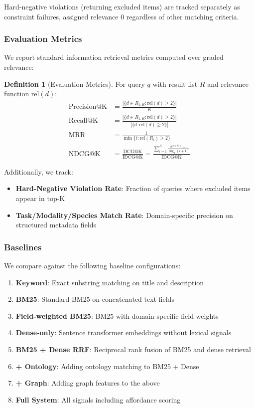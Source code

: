 \documentclass{article}
\theoremstyle{definition}
\newtheorem{definition}{Definition}[section]
\begin{document}
Hard-negative violations (returning excluded items) are tracked separately as constraint failures, assigned relevance 0 regardless of other matching criteria.

\subsubsection{Evaluation Metrics}

We report standard information retrieval metrics computed over graded relevance:

\begin{definition}[Evaluation Metrics]
For query $q$ with result list $R$ and relevance function $\text{rel}(d)$:
\begin{align}
\text{Precision@K} &= \frac{|\{d \in R_{1:K} : \text{rel}(d) \geq 2\}|}{K} \\
\text{Recall@K} &= \frac{|\{d \in R_{1:K} : \text{rel}(d) \geq 2\}|}{|\{d : \text{rel}(d) \geq 2\}|} \\
\text{MRR} &= \frac{1}{\min\{i : \text{rel}(R_i) \geq 2\}} \\
\text{NDCG@K} &= \frac{\text{DCG@K}}{\text{IDCG@K}} = \frac{\sum_{i=1}^{K} \frac{2^{\text{rel}(R_i)} - 1}{\log_2(i+1)}}{\text{IDCG@K}}
\end{align}
\end{definition}

Additionally, we track:
\begin{itemize}
    \item \textbf{Hard-Negative Violation Rate}: Fraction of queries where excluded items appear in top-K
    \item \textbf{Task/Modality/Species Match Rate}: Domain-specific precision on structured metadata fields
\end{itemize}

\subsubsection{Baselines}

We compare against the following baseline configurations:

\begin{enumerate}
    \item \textbf{Keyword}: Exact substring matching on title and description
    \item \textbf{BM25}: Standard BM25 on concatenated text fields
    \item \textbf{Field-weighted BM25}: BM25 with domain-specific field weights
    \item \textbf{Dense-only}: Sentence transformer embeddings without lexical signals
    \item \textbf{BM25 + Dense RRF}: Reciprocal rank fusion of BM25 and dense retrieval
    \item \textbf{+ Ontology}: Adding ontology matching to BM25 + Dense
    \item \textbf{+ Graph}: Adding graph features to the above
    \item \textbf{Full System}: All signals including affordance scoring
\end{enumerate}
\end{document}
